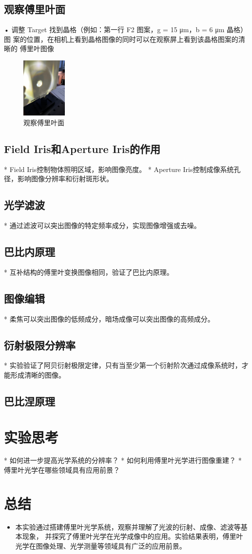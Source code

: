 \documentclass{ctexart}
\begin{document}
\subsection{观察傅里叶面}
• 调整 Target 找到晶格（例如：第一行 F2 图案，g = 15 μm，b = 6 μm 晶格）图
案的位置，在相机上看到晶格图像的同时可以在观察屏上看到该晶格图案的清晰的
傅里叶图像
\begin{figure}[htbp]
  \centering
  \includegraphics[width=0.2\textwidth,height=0.3\textwidth]{pictures/微信图片_20241010201008.jpg}
  \caption{观察傅里叶面} 
\end{figure}
\subsection{Field Iris和Aperture Iris的作用}
* Field Iris控制物体照明区域，影响图像亮度。
* Aperture Iris控制成像系统孔径，影响图像分辨率和衍射斑形状。
\subsection{光学滤波}
* 通过滤波可以突出图像的特定频率成分，实现图像增强或去噪。
\subsection{巴比内原理}
* 互补结构的傅里叶变换图像相同，验证了巴比内原理。
\subsection{图像编辑}
* 柔焦可以突出图像的低频成分，暗场成像可以突出图像的高频成分。
\subsection{衍射极限分辨率}
* 实验验证了阿贝衍射极限定律，只有当至少第一个衍射阶次通过成像系统时，才能形成清晰的图像。
\subsection{巴比涅原理}


\section{实验思考}
* 如何进一步提高光学系统的分辨率？
* 如何利用傅里叶光学进行图像重建？
* 傅里叶光学在哪些领域具有应用前景？

\section{总结}
\begin{itemize}
  \item 本实验通过搭建傅里叶光学系统，观察并理解了光波的衍射、成像、滤波等基本现象，
  并探究了傅里叶光学在光学成像中的应用。实验结果表明，傅里叶光学在图像处理、光学测量等领域具有广泛的应用前景。

\end{itemize}
\end{document}
